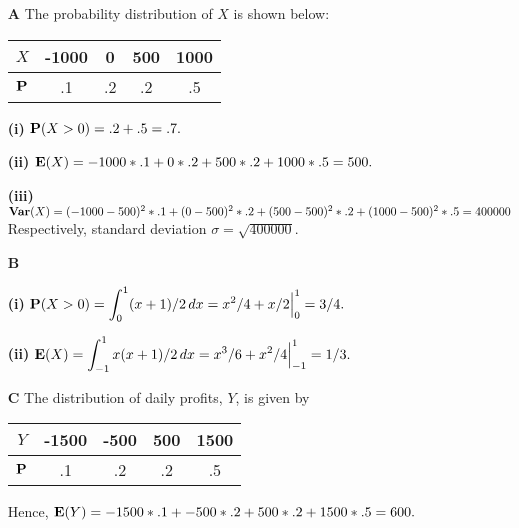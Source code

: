 \documentclass[10pt]{article}
\def\Pr{{\bf P}}
\def\E{{\bf E}}
\begin{document}
\begin{itemize}
\item[\bf A] The probability distribution of $X$ is shown below:
\begin{center}
\begin{tabular}{|c|c|c|c|c|}
  \hline
  $X$   & -1000 & 0 & 500 & 1000 \\
  \hline
  $\Pr$ & .1 & .2 & .2 & .5 \\ \hline
\end{tabular}
\end{center}
\item[\bf (i)]   $\Pr(X>0)=.2+.5=.7.$
\item[\bf (ii)]  $\E(X)=-1000*.1+0*.2+500*.2+1000*.5=500.$
\item[\bf (iii)] ${\bf
Var}(X)=(-1000-500)^2*.1+(0-500)^2*.2+(500-500)^2*.2+(1000-500)^2*.5=400000$
Respectively, standard deviation $\sigma=\sqrt{400000}$.
\item[\bf B]
\item[\bf (i)]
$\Pr(X>0)=\displaystyle\int_0^1(x+1)/2\,dx=x^2/4+x/2\Big|_0^1=3/4.$
\item[\bf (ii)]
$\displaystyle\E(X)=\int_{-1}^1x(x+1)/2\,dx=x^3/6+x^2/4\Big|_{-1}^1=1/3.$
\item[\bf C]
The distribution of daily profits, $Y$, is given by
\begin{center}
\begin{tabular}{|c|c|c|c|c|}
  \hline
  $Y$   & -1500 & -500 & 500 & 1500 \\
  \hline
  $\Pr$ & .1 & .2 & .2 & .5 \\ \hline
\end{tabular}
\end{center}
Hence, $\E(Y)=-1500*.1+-500*.2+500*.2+1500*.5=600.$

\end{itemize}
\end{document}

